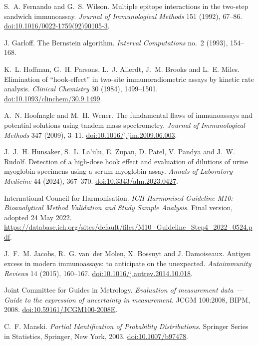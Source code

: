  S.~A. Fernando and G.~S. Wilson.
Multiple epitope interactions in the two-step sandwich immunoassay.
\emph{Journal of Immunological Methods} 151 (1992), 67--86.
\href{https://doi.org/10.1016/0022-1759(92)90105-3}{doi:10.1016/0022-1759(92)90105-3}.

 J. Garloff.
The Bernstein algorithm.
\emph{Interval Computations} no.~2 (1993), 154--168.

 K.~L. Hoffman, G.~H. Parsons, L.~J. Allerdt, J.~M. Brooks and L.~E. Miles.
Elimination of ``hook-effect'' in two-site immunoradiometric assays by kinetic rate analysis.
\emph{Clinical Chemistry} 30 (1984), 1499--1501.
\href{https://doi.org/10.1093/clinchem/30.9.1499}{doi:10.1093/clinchem/30.9.1499}.

 A.~N. Hoofnagle and M.~H. Wener.
The fundamental flaws of immunoassays and potential solutions using tandem mass spectrometry.
\emph{Journal of Immunological Methods} 347 (2009), 3--11.
\href{https://doi.org/10.1016/j.jim.2009.06.003}{doi:10.1016/j.jim.2009.06.003}.

 J.~J.~H. Hunsaker, S.~L. La'ulu, E. Zupan, D. Patel, V. Pandya and J.~W. Rudolf.
Detection of a high-dose hook effect and evaluation of dilutions of urine myoglobin specimens using a serum myoglobin assay.
\emph{Annals of Laboratory Medicine} 44 (2024), 367--370.
\href{https://doi.org/10.3343/alm.2023.0427}{doi:10.3343/alm.2023.0427}.

 International Council for Harmonisation.
\emph{ICH Harmonised Guideline M10: Bioanalytical Method Validation and Study Sample Analysis}.
Final version, adopted 24 May 2022.
\url{https://database.ich.org/sites/default/files/M10_Guideline_Step4_2022_0524.pdf}.

 J.~F.~M. Jacobs, R.~G. van~der Molen, X. Bossuyt and J. Damoiseaux.
Antigen excess in modern immunoassays: to anticipate on the unexpected.
\emph{Autoimmunity Reviews} 14 (2015), 160--167.
\href{https://doi.org/10.1016/j.autrev.2014.10.018}{doi:10.1016/j.autrev.2014.10.018}.

 Joint Committee for Guides in Metrology.
\emph{Evaluation of measurement data --- Guide to the expression of uncertainty in measurement}.
JCGM 100:2008, BIPM, 2008.
\href{https://doi.org/10.59161/JCGM100-2008E}{doi:10.59161/JCGM100-2008E}.

 C.~F. Manski.
\emph{Partial Identification of Probability Distributions}.
Springer Series in Statistics, Springer, New York, 2003.
\href{https://doi.org/10.1007/b97478}{doi:10.1007/b97478}.

